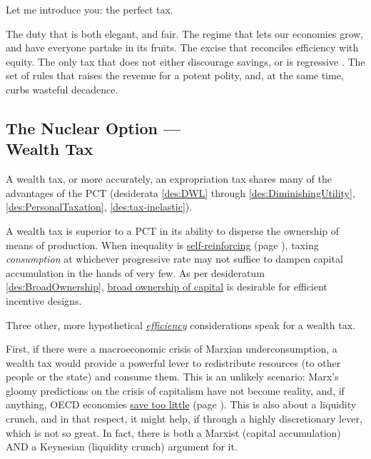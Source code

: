 Let me introduce you:
the perfect tax.

The duty that is both elegant, and fair.
The regime that lets our economies grow, and have everyone partake in its fruits.
The excise that reconciles efficiency with equity.
The only tax that does not either discourage savings, or is regressive \citep[2]{Seidman1997}.
The set of rules that raises the revenue for a potent polity, and, at the same time, curbs wasteful decadence.

\subsection[Wealth Tax]{The Nuclear Option ---\\Wealth Tax} \label{sec:ScoreWT} A wealth tax, or more accurately, an expropriation tax shares many of the advantages of the PCT (desiderata \ref{des:DWL} through \ref{des:DiminishingUtility}, \ref{des:PersonalTaxation}, \ref{des:tax-inelastic}).

A wealth tax is superior to a PCT in its ability to disperse the ownership of means of production.
When inequality is \hyperref[sec:GovDynofIneq]{self-reinforcing} (page \pageref{sec:GovDynofIneq}), taxing \emph{consumption} at whichever progressive rate may not suffice to dampen capital accumulation in the hands of very few.
As per desideratum \ref{des:BroadOwnership}, \hyperref[des:BroadOwnership]{broad ownership of capital} is desirable for efficient incentive designs.

Three other, more hypothetical \hyperref[sec:Efficiency]{\emph{efficiency}} considerations speak for a wealth tax.

First, if there were a macroeconomic crisis of Marxian %
underconsumption, a wealth tax would provide a powerful lever to redistribute resources (to other people or the state) and consume them.
This is an unlikely scenario:
Marx's gloomy predictions on the crisis of capitalism have not become reality, and, if anything, OECD economies \hyperref[des:Savings]{save too little} (page \pageref{des:Savings}).
This is also about a liquidity crunch, and in that respect, it might help, if through a highly discretionary lever, which is not so great.
In fact, there is both a Marxist (capital accumulation) AND a Keynesian (liquidity crunch) argument for it.

